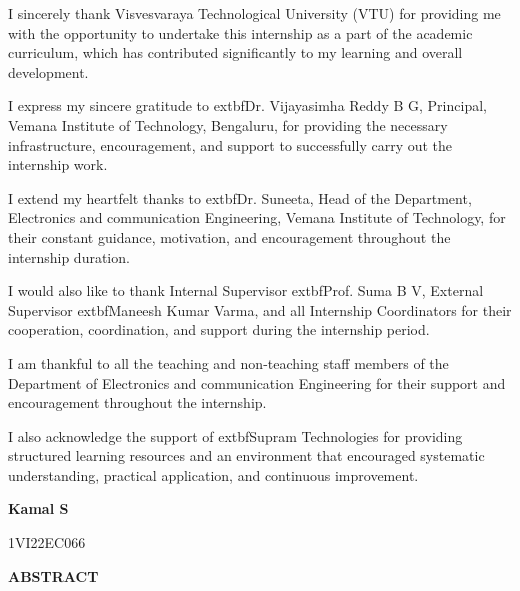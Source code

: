 \documentclass[12pt,a4paper]{report}
\begin{document}
\vspace{0.5cm}
\setlength{\parskip}{1em}
\begin{onehalfspacing}
I sincerely thank Visvesvaraya Technological University (VTU) for providing me with the opportunity to undertake this internship as a part of the academic curriculum, which has contributed significantly to my learning and overall development.

I express my sincere gratitude to 	extbf{Dr. Vijayasimha Reddy B G}, Principal, Vemana Institute of Technology, Bengaluru, for providing the necessary infrastructure, encouragement, and support to successfully carry out the internship work.

I extend my heartfelt thanks to 	extbf{Dr. Suneeta}, Head of the Department, Electronics and communication Engineering, Vemana Institute of Technology, for their constant guidance, motivation, and encouragement throughout the internship duration.

I would also like to thank Internal Supervisor 	extbf{Prof. Suma B V}, External Supervisor 	extbf{Maneesh Kumar Varma}, and all Internship Coordinators for their cooperation, coordination, and support during the internship period.

I am thankful to all the teaching and non-teaching staff members of the Department of Electronics and communication Engineering for their support and encouragement throughout the internship.

I also acknowledge the support of 	extbf{Supram Technologies} for providing structured learning resources and an environment that encouraged systematic understanding, practical application, and continuous improvement.
\end{onehalfspacing}
\setlength{\parskip}{0.4em}

\vspace{1cm}
\begin{flushright}
\textbf{Kamal S}\par
1VI22EC066\par
\end{flushright}

\newpage
\begin{center}
{\LARGE \textbf{ABSTRACT}\par}
\end{center}
\end{document}
